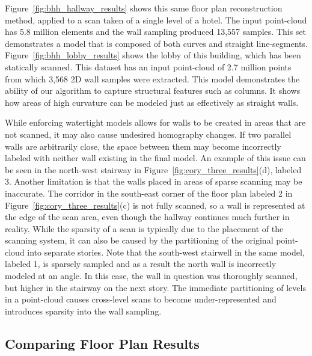 \documentclass[12pt,onecolumn,oneside]{book}
\begin{document}
Figure~\ref{fig:bhh_hallway_results} shows this same floor plan reconstruction method, applied to a scan taken of a single level of a hotel.  The input point-cloud has 5.8 million elements and the wall sampling produced 13,557 samples.  This set demonstrates a model that is composed of both curves and straight line-segments. Figure~\ref{fig:bhh_lobby_results} shows the lobby of this building, which has been statically scanned.  This dataset has an input point-cloud of 2.7 million points from which 3,568 2D wall samples were extracted. This model demonstrates the ability of our algorithm to capture structural features such as columns.  It shows how areas of high curvature can be modeled just as effectively as straight walls.

While enforcing watertight models allows for walls to be created in areas that are not scanned, it may also cause undesired homography changes.  If two parallel walls are arbitrarily close, the space between them may become incorrectly labeled with neither wall existing in the final model.  An example of this issue can be seen in the north-west stairway in Figure~\ref{fig:cory_three_results}(d), labeled 3.  Another limitation is that the walls placed in areas of sparse scanning may be inaccurate.  The corridor in the south-east corner of the floor plan labeled 2 in Figure~\ref{fig:cory_three_results}(c) is not fully scanned, so a wall is represented at the edge of the scan area, even though the hallway continues much further in reality.  While the sparsity of a scan is typically due to the placement of the scanning system, it can also be caused by the partitioning of the original point-cloud into separate stories.  Note that the south-west stairwell in the same model, labeled 1, is sparsely sampled and as a result the north wall is incorrectly modeled at an angle.  In this case, the wall in question was thoroughly scanned, but higher in the stairway on the next story.  The immediate partitioning of levels in a point-cloud causes cross-level scans to become under-represented and introduces sparsity into the wall sampling.

\subsection{Comparing Floor Plan Results}
\label{ssec:fp_results_compare}
\end{document}
